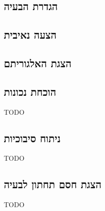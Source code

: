 \subsection{הגדרת הבעיה}

\subsection{הצעה נאיבית}

\subsection{הצגת האלגוריתם}

\subsection{הוכחת נכונות}

\begin{claim}
TODO
\end{claim}

\subsection{ניתוח סיבוכיות}

\begin{claim}
TODO
\end{claim}

\subsection{הצגת חסם תחתון לבעיה}

\begin{claim}
TODO
\end{claim}
